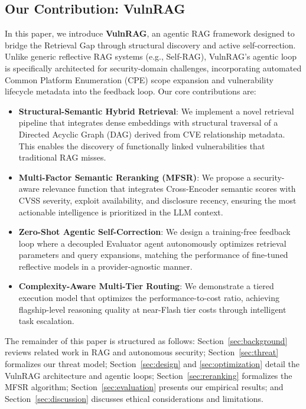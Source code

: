 \subsection{Our Contribution: VulnRAG}
In this paper, we introduce \textbf{VulnRAG}, an agentic RAG framework designed to bridge the Retrieval Gap through structural discovery and active self-correction. Unlike generic reflective RAG systems (e.g., Self-RAG), VulnRAG’s agentic loop is specifically architected for security-domain challenges, incorporating automated Common Platform Enumeration (CPE) scope expansion and vulnerability lifecycle metadata into the feedback loop. Our core contributions are:

\begin{itemize}
    \item \textbf{Structural-Semantic Hybrid Retrieval}: We implement a novel retrieval pipeline that integrates dense embeddings with structural traversal of a Directed Acyclic Graph (DAG) derived from CVE relationship metadata. This enables the discovery of functionally linked vulnerabilities that traditional RAG misses.
    \item \textbf{Multi-Factor Semantic Reranking (MFSR)}: We propose a security-aware relevance function that integrates Cross-Encoder semantic scores with CVSS severity, exploit availability, and disclosure recency, ensuring the most actionable intelligence is prioritized in the LLM context.
    \item \textbf{Zero-Shot Agentic Self-Correction}: We design a training-free feedback loop where a decoupled Evaluator agent autonomously optimizes retrieval parameters and query expansions, matching the performance of fine-tuned reflective models in a provider-agnostic manner.
    \item \textbf{Complexity-Aware Multi-Tier Routing}: We demonstrate a tiered execution model that optimizes the performance-to-cost ratio, achieving flagship-level reasoning quality at near-Flash tier costs through intelligent task escalation.
\end{itemize}

The remainder of this paper is structured as follows: Section~\ref{sec:background} reviews related work in RAG and autonomous security; Section~\ref{sec:threat} formalizes our threat model; Section~\ref{sec:design} and \ref{sec:optimization} detail the VulnRAG architecture and agentic loops; Section~\ref{sec:reranking} formalizes the MFSR algorithm; Section~\ref{sec:evaluation} presents our empirical results; and Section~\ref{sec:discussion} discusses ethical considerations and limitations.
